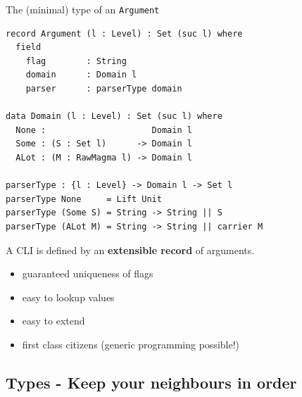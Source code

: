 \documentclass[dvipsnames]{beamer}
\begin{document}
\begin{frame}[fragile]{The (minimal) type of an \texttt{Argument}}
\begin{verbatim}
record Argument (l : Level) : Set (suc l) where
  field
    flag        : String
    domain      : Domain l
    parser      : parserType domain

data Domain (l : Level) : Set (suc l) where
  None :                     Domain l
  Some : (S : Set l)      -> Domain l
  ALot : (M : RawMagma l) -> Domain l

parserType : {l : Level} -> Domain l -> Set l
parserType None     = Lift Unit
parserType (Some S) = String -> String || S
parserType (ALot M) = String -> String || carrier M
\end{verbatim}
\end{frame}

\begin{frame}[fragile]
  A CLI is defined by an \textbf{extensible record} of arguments.

  \begin{itemize}
    \item guaranteed uniqueness of flags
    \item easy to lookup values
    \item easy to extend
    \item first class citizens (generic programming possible!)
  \end{itemize}
\end{frame}

\subsection{Types - Keep your neighbours in order}
\end{document}
